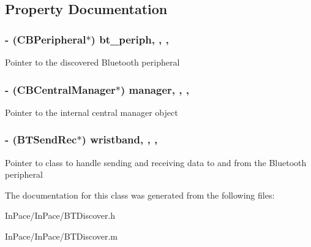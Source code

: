 \subsection{Property Documentation}
\hypertarget{interfaceBTDiscover_a611f96cb207ccfc4bc06e33f54183374}{
\subsubsection[{bt\-\_\-periph}]{\setlength{\rightskip}{0pt plus 5cm}-\/ (C\-B\-Peripheral$\ast$) bt\-\_\-periph\hspace{0.3cm}{\ttfamily [read]}, {\ttfamily [write]}, {\ttfamily [atomic]}, {\ttfamily [strong]}}}\label{interfaceBTDiscover_a611f96cb207ccfc4bc06e33f54183374}
Pointer to the discovered Bluetooth peripheral \hypertarget{interfaceBTDiscover_a7e656419213fe4da7163a7fc82fcc2a9}{
\subsubsection[{manager}]{\setlength{\rightskip}{0pt plus 5cm}-\/ (C\-B\-Central\-Manager$\ast$) manager\hspace{0.3cm}{\ttfamily [read]}, {\ttfamily [write]}, {\ttfamily [atomic]}, {\ttfamily [strong]}}}\label{interfaceBTDiscover_a7e656419213fe4da7163a7fc82fcc2a9}
Pointer to the internal central manager object \hypertarget{interfaceBTDiscover_ac6fc7e50655c8ad721cb1e3a167767b6}{
\subsubsection[{wristband}]{\setlength{\rightskip}{0pt plus 5cm}-\/ ({\bf B\-T\-Send\-Rec}$\ast$) wristband\hspace{0.3cm}{\ttfamily [read]}, {\ttfamily [write]}, {\ttfamily [nonatomic]}, {\ttfamily [strong]}}}\label{interfaceBTDiscover_ac6fc7e50655c8ad721cb1e3a167767b6}
Pointer to class to handle sending and receiving data to and from the Bluetooth peripheral 

The documentation for this class was generated from the following files\-:\begin{DoxyCompactItemize}
\item 
In\-Pace/\-In\-Pace/B\-T\-Discover.\-h\item 
In\-Pace/\-In\-Pace/B\-T\-Discover.\-m\end{DoxyCompactItemize}
